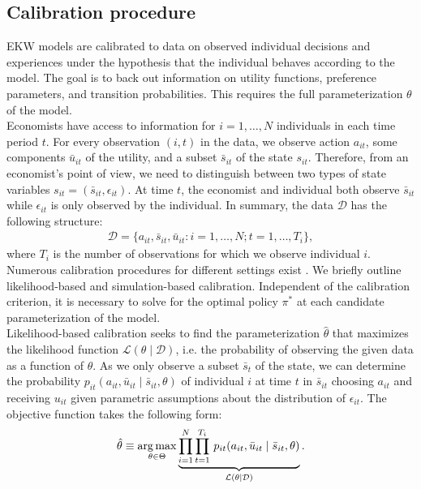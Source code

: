 \subsection{Calibration procedure}
EKW models are calibrated to data on observed individual decisions and experiences under the hypothesis that the individual behaves according to the model. The goal is to back out information on utility functions, preference parameters, and transition probabilities. This requires the full parameterization $\theta$ of the model.\\

\noindent Economists have access to information for $i = 1, \hdots, N$ individuals in each time period $t$. For every observation $(i, t)$ in the data, we observe action $a_{it}$, some components $\bar{u}_{it}$ of the utility, and a subset $\bar{s}_{it}$ of the state $s_{it}$. Therefore, from an economist's point of view, we need to distinguish between two types of state variables $s_{it} = (\bar{s}_{it}, \epsilon_{it})$. At time $t$, the economist and individual both observe $\bar{s}_{it}$ while $\epsilon_{it}$ is only observed by the individual. In summary, the data $\mathcal{D}$ has the following structure:
%
\begin{align*}
  \mathcal{D} = \{a_{it}, \bar{s}_{it}, \bar{u}_{it}: i = 1, \hdots, N; t = 1, \hdots, T_i\},
\end{align*}
where $T_i$ is the number of observations for which we observe individual $i$.\\

\noindent Numerous calibration procedures for different settings exist \citep{Davidson.2003, Gourieroux.1996}. We briefly outline likelihood-based and simulation-based calibration. Independent of the calibration criterion, it is necessary to solve for the optimal policy $\pi^*$ at each candidate parameterization of the model.\\

\noindent Likelihood-based calibration seeks to find the parameterization $\hat{\theta}$ that maximizes the likelihood function $\mathcal{L}(\theta\mid\mathcal{D})$, i.e. the probability of observing the given data as a function of $\theta$. As we only observe a subset $\bar{s}_t$ of the state, we can determine the probability $p_{it}(a_{it}, \bar{u}_{it} \mid \bar{s}_{it}, \theta)$ of individual $i$ at time $t$ in $\bar{s}_{it}$ choosing $a_{it}$ and receiving $u_{it}$ given parametric assumptions about the distribution of $\epsilon_{it}$. The objective function takes the following form:
%
\begin{align*}
  \hat{\theta} \equiv \operatorname*{arg\,max}_{\theta \in \Theta}  \underbrace{\prod^N_{i= 1} \prod^{T_i}_{t= 1}\, p_{it}(a_{it}, \bar{u}_{it} \mid \bar{s}_{it}, \theta)}_{\mathcal{L}(\theta\mid\mathcal{D})}.
\end{align*}

